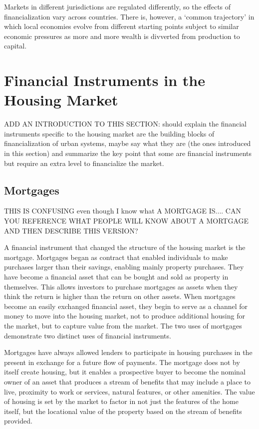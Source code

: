 Markets in different jurisdictions are regulated differently, so the effects of financialization vary across countries. There is, however, a ‘common trajectory’ \cite{hayCommonTrajectoriesVariable2004}\cite{aalbersConversationLandRent2018} in which local economies evolve from different starting points subject to similar economic pressures as more and more wealth is divverted from production to capital.




\section{Financial Instruments in the Housing Market}

{\color{red} ADD AN INTRODUCTION TO THIS SECTION: should explain the financial instruments specific to the housing market are the building blocks of financialization of urban systems, maybe say what they are (the ones introduced in this section) and summarize the key point that some are financial instruments but require an extra level to financialize the market.}

\subsection{Mortgages}
{\color{red}THIS IS CONFUSING even though I know what A MORTGAGE IS.... CAN YOU REFERENCE WHAT PEOPLE WILL KNOW ABOUT A MORTGAGE AND THEN DESCRIBE THIS VERSION?}


A financial instrument that changed the structure of the housing market is the mortgage. Mortgages began as contract that enabled individuals to make purchases larger than their savings, enabling mainly property purchases. They have become a financial asset that can be bought and sold as property in themselves. This allows investors to purchase mortgages as assets when they think the return is higher than the return on other assets.  When mortgages become an easily exchanged financial asset, they begin to serve as a channel for money to move into the housing market, not to produce additional housing for the market, but to capture value from the market. The two uses of mortgages demonstrate two distinct uses of financial instruments.  

Mortgages have always allowed lenders to participate in housing purchases in the present in exchange for a future flow of payments. The mortgage does not by itself create housing, but it enables a prospective buyer to become the nominal owner of an asset that produces a stream of benefits that may include a place to live, proximity to work or services, natural features, or other amenities. The value of housing is set by the market to factor in not just the features of the home itself, but the locational value of the property based on the stream of benefits provided. 

